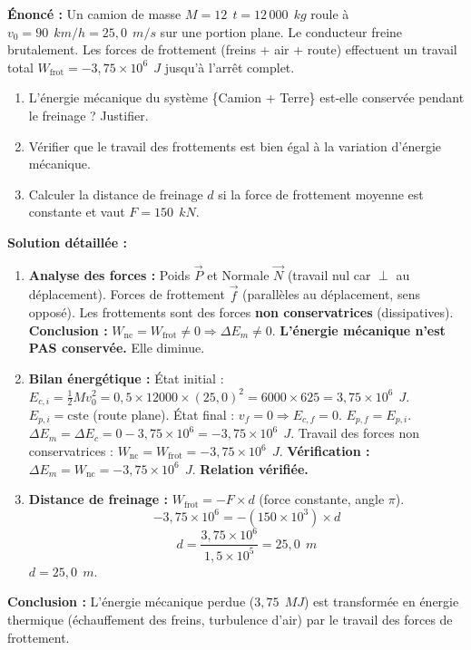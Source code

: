 \documentclass[11pt]{article}
\begin{document}
\begin{exoresolu}
    \textbf{Énoncé :} Un camion de masse $M = 12\ \SI{}{t} = 12\,000\ \SI{}{kg}$ roule à $v_0 = 90\ \SI{}{km/h} = 25,0\ \SI{}{m/s}$ sur une portion plane. Le conducteur freine brutalement. Les forces de frottement (freins + air + route) effectuent un travail total $W_{\text{frot}} = -3,75 \times 10^6\ \SI{}{J}$ jusqu'à l'arrêt complet.
    \begin{enumerate}
        \item L'énergie mécanique du système \{Camion + Terre\} est-elle conservée pendant le freinage ? Justifier.
        \item Vérifier que le travail des frottements est bien égal à la variation d'énergie mécanique.
        \item Calculer la distance de freinage $d$ si la force de frottement moyenne est constante et vaut $F = 150\ \SI{}{kN}$.
    \end{enumerate}
    \tcblower
    \textbf{Solution détaillée :}
    \begin{enumerate}
        \item \textbf{Analyse des forces :} Poids $\vec{P}$ et Normale $\vec{N}$ (travail nul car $\perp$ au déplacement). Forces de frottement $\vec{f}$ (parallèles au déplacement, sens opposé). Les frottements sont des forces \textbf{non conservatrices} (dissipatives).
        \textbf{Conclusion :} $W_{\text{nc}} = W_{\text{frot}} \neq 0 \Rightarrow \Delta E_m \neq 0$. \textbf{L'énergie mécanique n'est PAS conservée.} Elle diminue.
        \item \textbf{Bilan énergétique :}
        État initial : $E_{c,i} = \frac{1}{2} M v_0^2 = 0,5 \times 12000 \times (25,0)^2 = 6000 \times 625 = 3,75 \times 10^6\ \SI{}{J}$. $E_{p,i} = \text{cste}$ (route plane).
        État final : $v_f = 0 \Rightarrow E_{c,f} = 0$. $E_{p,f} = E_{p,i}$.
        $\Delta E_m = \Delta E_c = 0 - 3,75 \times 10^6 = -3,75 \times 10^6\ \SI{}{J}$.
        Travail des forces non conservatrices : $W_{\text{nc}} = W_{\text{frot}} = -3,75 \times 10^6\ \SI{}{J}$.
        \textbf{Vérification :} $\Delta E_m = W_{\text{nc}} = -3,75 \times 10^6\ \SI{}{J}$. \textbf{Relation vérifiée.}
        \item \textbf{Distance de freinage :} $W_{\text{frot}} = - F \times d$ (force constante, angle $\pi$).
        \[ -3,75 \times 10^6 = - (150 \times 10^3) \times d \]
        \[ d = \frac{3,75 \times 10^6}{1,5 \times 10^5} = 25,0\ \SI{}{m} \]
        $\boxed{d = 25,0\ \SI{}{m}}$.
    \end{enumerate}
    \textbf{Conclusion :} L'énergie mécanique perdue ($3,75\ \SI{}{MJ}$) est transformée en énergie thermique (échauffement des freins, turbulence d'air) par le travail des forces de frottement.
\end{exoresolu}
\end{document}
